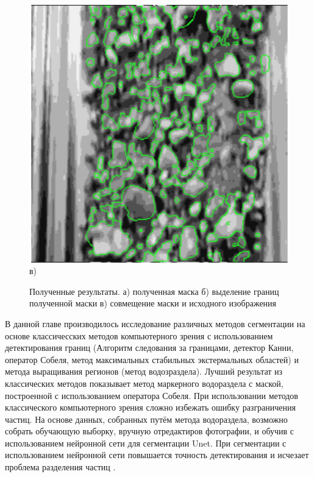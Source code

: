 \documentclass[times]{itmo-student-thesis}
\begin{document}
\begin{figure}[h!]
\begin{minipage}[h]{0.3\linewidth}
 	\end{minipage}
  	\hfill
 	\begin{minipage}[h]{0.3\linewidth}
 	\centering
 	\includegraphics[width=\linewidth]{images/unetresult} \\в)
 \end{minipage}
 	\caption{Полученные результаты. а) полученная маска б) выделение границ полученной маски в) совмещение маски и исходного изображения}
 	\label{fig:unetresult}
 \end{figure}

\chapterconclusion
В данной главе производилось исследование различных методов сегментации на основе классичесских методов компьютерного зрения с использованием детектирования границ (Алгоритм следования за границами, детектор Канни, оператор Собеля, метод максимальных стабильных экстермальных областей) и метода выращивания регионов (метод водозраздела). Лучший результат из классических методов показывает метод маркерного водораздела с маской, построенной с использованием оператора Собеля. При использовании методов классического компьютерного зрения сложно избежать ошибку разграничения частиц. 
На основе данных, собранных путём метода водораздела, возможно собрать обучающую выборку, вручную отредактиров фотографии, и обучив с использованием нейронной сети для сегментации Unet. При сегментации с использованием нейронной сети повышается точность детектирования и исчезает проблема разделения частиц .
\end{document}
